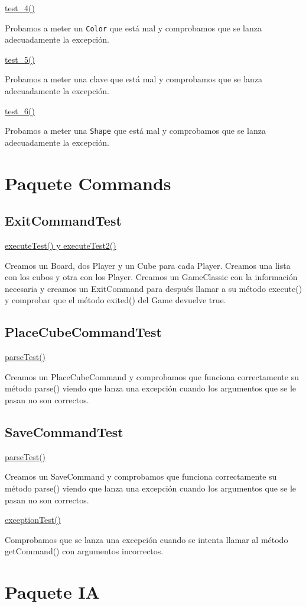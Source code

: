 \documentclass[../DocumentoOficial.tex]{subfiles}
\begin{document}
\underline{test\_4()}

Probamos a meter un \texttt{Color} que está mal y comprobamos que se lanza adecuadamente la excepción.

\underline{test\_5()}

Probamos a meter una clave que está mal y comprobamos que se lanza adecuadamente la excepción.

\underline{test\_6()}

Probamos a meter una \texttt{Shape} que está mal y comprobamos que se lanza adecuadamente la excepción.


\section{Paquete Commands}
\subsection{ExitCommandTest}
\underline{executeTest() y executeTest2()}

Creamos un Board, dos Player y un Cube para cada Player. Creamos una lista con los cubos y otra con los Player. Creamos un GameClassic con la información necesaria y creamos un ExitCommand para después llamar a su método execute() y comprobar que el método exited() del Game devuelve true.

\subsection{PlaceCubeCommandTest}
\underline{parseTest()}

Creamos un PlaceCubeCommand y comprobamos que funciona correctamente su método parse() viendo que lanza una excepción cuando los argumentos que se le pasan no son correctos.

\subsection{SaveCommandTest}
\underline{parseTest()}

Creamos un SaveCommand y comprobamos que funciona correctamente su método parse() viendo que lanza una excepción cuando los argumentos que se le pasan no son correctos.

\underline{exceptionTest()}

Comprobamos que se lanza una excepción cuando se intenta llamar al método getCommand() con argumentos incorrectos.


\section{Paquete IA}
\end{document}
